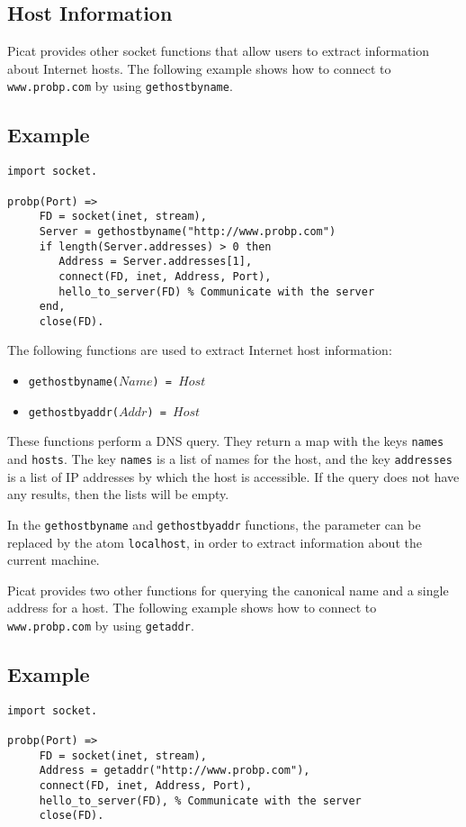 \subsection{Host Information}
Picat provides other socket functions that allow users to extract information about Internet hosts.  The following example shows how to connect to \texttt{www.probp.com} by using \texttt{gethostbyname}.

\subsection*{Example}
\begin{verbatim}
import socket.

probp(Port) =>
     FD = socket(inet, stream),
     Server = gethostbyname("http://www.probp.com")
     if length(Server.addresses) > 0 then 
        Address = Server.addresses[1],
        connect(FD, inet, Address, Port),
        hello_to_server(FD) % Communicate with the server
     end,
     close(FD). 
\end{verbatim}

The following functions are used to extract Internet host information:
\begin{itemize}
\item \texttt{gethostbyname($Name$) = $Host$}
\item \texttt{gethostbyaddr($Addr$) = $Host$}
\end{itemize}
These functions perform a DNS query.  They return a map with the keys \texttt{names} and \texttt{hosts}.  The key \texttt{names} is a list of names for the host, and the key \texttt{addresses} is a list of IP addresses by which the host is accessible.  If the query does not have any results, then the lists will be empty.

In the \texttt{gethostbyname} and \texttt{gethostbyaddr} functions, the parameter can be replaced by the atom \texttt{localhost}, in order to extract information about the current machine.

Picat provides two other functions for querying the canonical name and a single address for a host.  The following example shows how to connect to \texttt{www.probp.com} by using \texttt{getaddr}.

\subsection*{Example}
\begin{verbatim}
import socket.

probp(Port) =>
     FD = socket(inet, stream),
     Address = getaddr("http://www.probp.com"),
     connect(FD, inet, Address, Port),
     hello_to_server(FD), % Communicate with the server
     close(FD). 
\end{verbatim}

